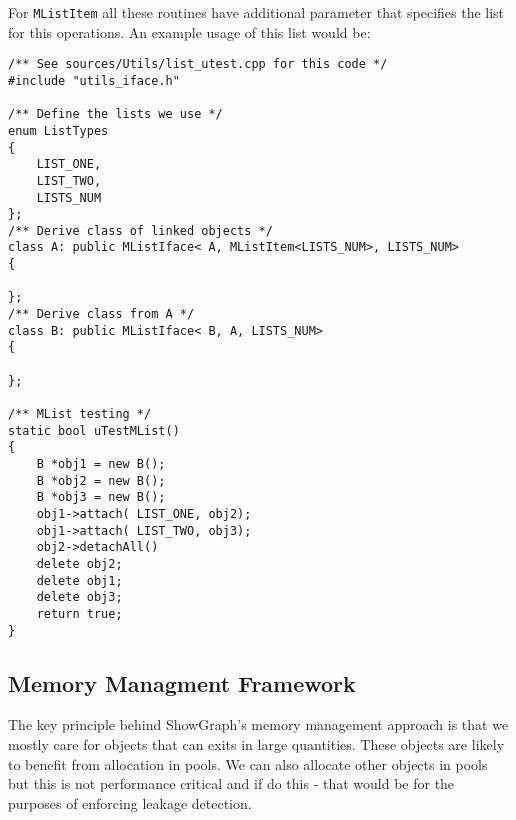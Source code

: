 \documentclass[11pt,twoside,a4paper]{article}
\begin{document}
For \lstinline{MListItem} all these routines have additional parameter that specifies the list for this operations. An example usage of this list would be:
\begin{lstlisting}
/** See sources/Utils/list_utest.cpp for this code */
#include "utils_iface.h"

/** Define the lists we use */
enum ListTypes
{
    LIST_ONE,
    LIST_TWO,
    LISTS_NUM
};
/** Derive class of linked objects */
class A: public MListIface< A, MListItem<LISTS_NUM>, LISTS_NUM>
{

};
/** Derive class from A */
class B: public MListIface< B, A, LISTS_NUM>
{

};

/** MList testing */
static bool uTestMList()
{
    B *obj1 = new B();
    B *obj2 = new B();
    B *obj3 = new B();
    obj1->attach( LIST_ONE, obj2);
    obj1->attach( LIST_TWO, obj3);
    obj2->detachAll()
    delete obj2;
    delete obj1;
    delete obj3;
    return true;
}

\end{lstlisting}
\subsection{Memory Managment Framework}
The key principle behind ShowGraph's memory management approach is that we mostly care for objects that can exits in large quantities. These objects are likely to benefit from allocation in pools. We can also allocate other objects in pools but this is not performance critical and if do this - that would be for the purposes of enforcing leakage detection.
\end{document}
